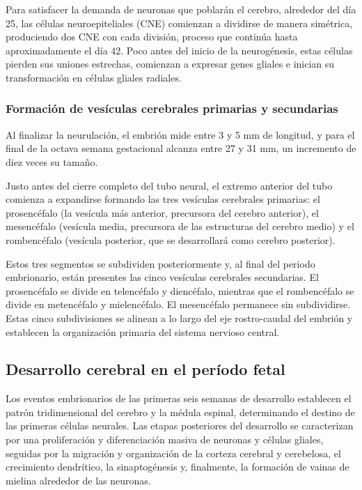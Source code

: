 \documentclass[11pt,letterpaper]{report}
\begin{document}
Para satisfacer la demanda de neuronas que poblarán el cerebro, alrededor del
día 25, las células neuroepiteliales (CNE) comienzan a dividirse de manera
simétrica, produciendo dos CNE con cada división, proceso que continúa hasta
aproximadamente el día 42. Poco antes del inicio de la neurogénesis, estas
células pierden sus uniones estrechas, comienzan a expresar genes gliales e
inician su transformación en células gliales radiales. \cite{Stiles2010}

\subsubsection{Formación de vesículas cerebrales primarias y secundarias}
Al finalizar la neurulación, el embrión mide entre 3 y 5 mm de longitud, y para
el final de la octava semana gestacional alcanza entre 27 y 31 mm, un
incremento de diez veces su tamaño. \cite{Stiles2010}

Justo antes del cierre completo del tubo neural, el extremo anterior del tubo
comienza a expandirse formando las tres vesículas cerebrales primarias: el
prosencéfalo (la vesícula más anterior, precursora del cerebro anterior), el
mesencéfalo (vesícula media, precursora de las estructuras del cerebro medio) y
el rombencéfalo (vesícula posterior, que se desarrollará como cerebro
posterior). \cite{Stiles2010}

Estos tres segmentos se subdividen posteriormente y, al final del periodo
embrionario, están presentes las cinco vesículas cerebrales secundarias. El
prosencéfalo se divide en telencéfalo y diencéfalo, mientras que el
rombencéfalo se divide en metencéfalo y mielencéfalo. El mesencéfalo permanece
sin subdividirse. Estas cinco subdivisiones se alinean a lo largo del eje
rostro-caudal del embrión y establecen la organización primaria del sistema
nervioso central. \cite{Stiles2010}

\subsection{Desarrollo cerebral en el período fetal}
Los eventos embrionarios de las primeras seis semanas de desarrollo establecen
el patrón tridimensional del cerebro y la médula espinal, determinando el
destino de las primeras células neurales. Las etapas posteriores del desarrollo
se caracterizan por una proliferación y diferenciación masiva de neuronas y
células gliales, seguidas por la migración y organización de la corteza
cerebral y cerebelosa, el crecimiento dendrítico, la sinaptogénesis y,
finalmente, la formación de vainas de mielina alrededor de las neuronas.
\cite{Polin124}
\end{document}
